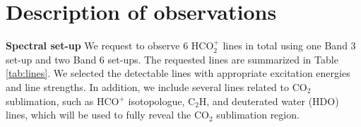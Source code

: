 \documentclass[12pt,a4paper]{article}  %
\newcommand{\carbondioxide}{CO$_2$\xspace}
\newcommand{\protonatedcarbondioxide}{HCO$_2^+$\xspace}
\begin{document}

%





\section{Description of observations}


\noindent \textbf{Spectral set-up} \quad We request to observe 6 \protonatedcarbondioxide lines in total using one Band 3 set-up and two Band 6 set-ups. The requested lines are summarized in Table \ref{tab:lines}. We selected the detectable lines with appropriate excitation energies and line strengths. In addition, we include several lines related to \carbondioxide sublimation, such as HCO$^+$ isotopologue, C$_2$H, and deuterated water (HDO) lines, which will be used to fully reveal the \carbondioxide sublimation region.
\end{document}
